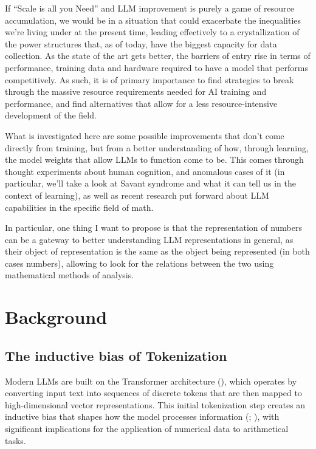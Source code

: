 \documentclass[
  a4paper, twoside, 10pt, titlepage]{book}
\begin{document}
If ``Scale is all you Need'' and LLM improvement is purely a game of
resource accumulation, we would be in a situation that could exacerbate
the inequalities we're living under at the present time, leading
effectively to a crystallization of the power structures that, as of
today, have the biggest capacity for data collection. As the state of
the art gets better, the barriers of entry rise in terms of performance,
training data and hardware required to have a model that performs
competitively. As such, it is of primary importance to find strategies
to break through the massive resource requirements needed for AI
training and performance, and find alternatives that allow for a less
resource-intensive development of the field.

What is investigated here are some possible improvements that don't come
directly from training, but from a better understanding of how, through
learning, the model weights that allow LLMs to function come to be. This
comes through thought experiments about human cognition, and anomalous
cases of it (in particular, we'll take a look at Savant syndrome and
what it can tell us in the context of learning), as well as recent
research put forward about LLM capabilities in the specific field of
math.

In particular, one thing I want to propose is that the representation of
numbers can be a gateway to better understanding LLM representations in
general, as their object of representation is the same as the object
being represented (in both cases numbers), allowing to look for the
relations between the two using mathematical methods of analysis.

\chapter{Background}\label{background}

\section{The inductive bias of
Tokenization}\label{the-inductive-bias-of-tokenization}

Modern LLMs are built on the Transformer architecture
(), which operates by
converting input text into sequences of discrete tokens that are then
mapped to high-dimensional vector representations. This initial
tokenization step creates an inductive bias that shapes how the model
processes information (;
), with significant
implications for the application of numerical data to arithmetical
tasks.
\end{document}
